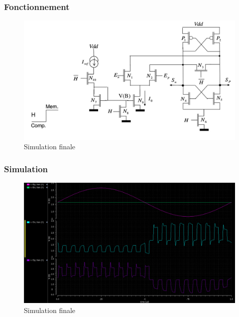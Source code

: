 \documentclass{beamer}
\begin{document}
\begin{frame}
\frametitle{Fonctionnement}

\begin{figure}[!htb]
  \includegraphics[width=0.8\linewidth]{comparateur_schema.jpg}
  \caption{Simulation finale}
\end{figure}

\end{frame}


\begin{frame}
\frametitle{Simulation}

\begin{figure}[!htb]
  \includegraphics[width=0.8\linewidth]{simu_comp_pas_ameliore.png}
  \caption{Simulation finale}
\end{figure}

\end{frame}

\end{document}
